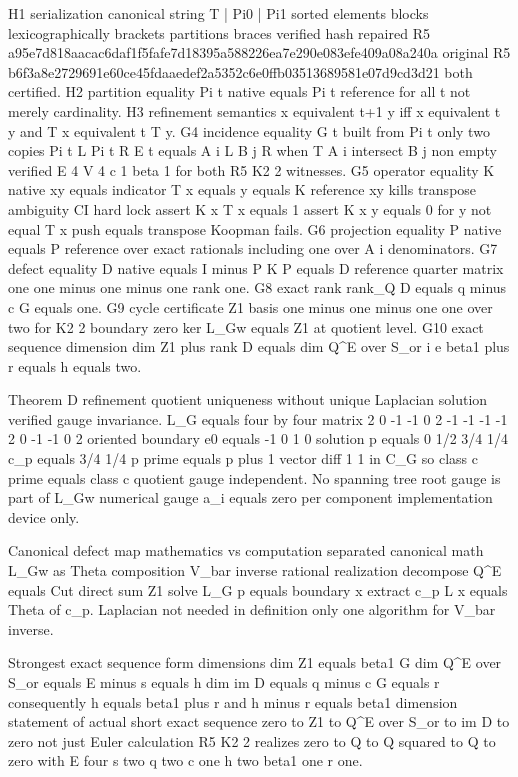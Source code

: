 H1 serialization canonical string T | Pi0 | Pi1 sorted elements blocks lexicographically brackets partitions braces verified hash repaired R5 a95e7d818aacac6daf1f5fafe7d18395a588226ea7e290e083efe409a08a240a original R5 b6f3a8e2729691e60ce45fdaaedef2a5352c6e0ffb03513689581e07d9cd3d21 both certified. H2 partition equality Pi t native equals Pi t reference for all t not merely cardinality. H3 refinement semantics x equivalent t+1 y iff x equivalent t y and T x equivalent t T y. G4 incidence equality G t built from Pi t only two copies Pi t L Pi t R E t equals A i L B j R when T A i intersect B j non empty verified E 4 V 4 c 1 beta 1 for both R5 K2 2 witnesses. G5 operator equality K native xy equals indicator T x equals y equals K reference xy kills transpose ambiguity CI hard lock assert K x T x equals 1 assert K x y equals 0 for y not equal T x push equals transpose Koopman fails. G6 projection equality P native equals P reference over exact rationals including one over A i denominators. G7 defect equality D native equals I minus P K P equals D reference quarter matrix one one minus one minus one rank one. G8 exact rank rank_Q D equals q minus c G equals one. G9 cycle certificate Z1 basis one minus one minus one one over two for K2 2 boundary zero ker L_Gw equals Z1 at quotient level. G10 exact sequence dimension dim Z1 plus rank D equals dim Q^E over S_or i e beta1 plus r equals h equals two.

Theorem D refinement quotient uniqueness without unique Laplacian solution verified gauge invariance. L_G equals four by four matrix 2 0 -1 -1 0 2 -1 -1 -1 -1 2 0 -1 -1 0 2 oriented boundary e0 equals -1 0 1 0 solution p equals 0 1/2 3/4 1/4 c_p equals 3/4 1/4 p prime equals p plus 1 vector diff 1 1 in C_G so class c prime equals class c quotient gauge independent. No spanning tree root gauge is part of L_Gw numerical gauge a_i equals zero per component implementation device only.

Canonical defect map mathematics vs computation separated canonical math L_Gw as Theta composition V_bar inverse rational realization decompose Q^E equals Cut direct sum Z1 solve L_G p equals boundary x extract c_p L x equals Theta of c_p. Laplacian not needed in definition only one algorithm for V_bar inverse.

Strongest exact sequence form dimensions dim Z1 equals beta1 G dim Q^E over S_or equals E minus s equals h dim im D equals q minus c G equals r consequently h equals beta1 plus r and h minus r equals beta1 dimension statement of actual short exact sequence zero to Z1 to Q^E over S_or to im D to zero not just Euler calculation R5 K2 2 realizes zero to Q to Q squared to Q to zero with E four s two q two c one h two beta1 one r one.

